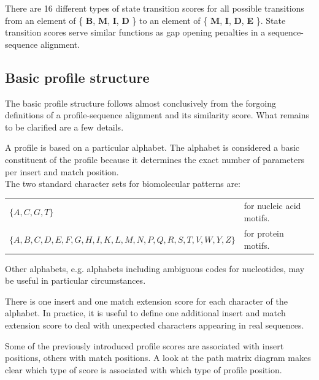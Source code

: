 \documentclass[a4paper,10pt,twoside]{scrartcl}
\begin{document}
  There are 16 different types of state transition scores for all possible transitions from an element of \{ \textbf{B}, \textbf{M}, \textbf{I}, \textbf{D} \}
  to an element of \{ \textbf{M}, \textbf{I}, \textbf{D}, \textbf{E} \}. State transition scores serve similar functions as gap opening penalties in a
  sequence-sequence alignment.

  \subsection{Basic profile structure}

  The basic profile structure follows almost conclusively from the forgoing definitions of a profile-sequence alignment and its similarity score.
  What remains to be clarified are a few details.

  A profile is based on a particular alphabet. The alphabet is considered a basic constituent of the profile because it determines the exact number of
  parameters per insert and match position. \\
  The two standard character sets for biomolecular patterns are:
  \begin{center}
  \begin{tabular}{ll}
   $\{ A,C,G,T \} $ & for nucleic acid motifs. \\
   $\{A,B,C,D,E,F,G,H,I,K,L,M,N,P,Q,R,S,T,V,W,Y,Z\}$ & for protein motifs.
  \end{tabular}
  \end{center}

  Other alphabets, e.g. alphabets including ambiguous codes for nucleotides, may be useful in particular circumstances.

  There is one insert and one match extension score for each character of the alphabet.  In practice, it is useful to define one additional insert
  and match extension score to deal with unexpected characters appearing in real sequences.

  Some of the previously introduced profile scores are associated with insert positions, others with match positions. A look at the path matrix
  diagram makes clear which type of score is associated with which type of profile position.
\end{document}
